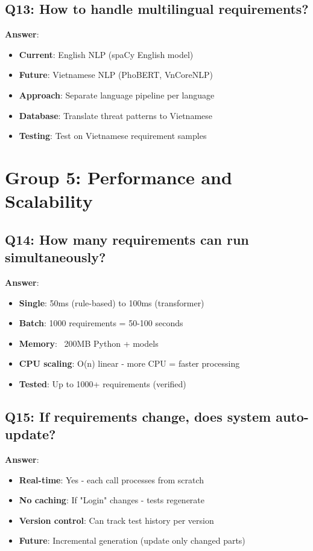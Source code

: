 \documentclass[12pt,a4paper]{report}
\begin{document}
\subsection{Q13: How to handle multilingual requirements?}

\textbf{Answer}:
\begin{itemize}
    \item \textbf{Current}: English NLP (spaCy English model)
    \item \textbf{Future}: Vietnamese NLP (PhoBERT, VnCoreNLP)
    \item \textbf{Approach}: Separate language pipeline per language
    \item \textbf{Database}: Translate threat patterns to Vietnamese
    \item \textbf{Testing}: Test on Vietnamese requirement samples
\end{itemize}

\section{Group 5: Performance and Scalability}

\subsection{Q14: How many requirements can run simultaneously?}

\textbf{Answer}:
\begin{itemize}
    \item \textbf{Single}: 50ms (rule-based) to 100ms (transformer)
    \item \textbf{Batch}: 1000 requirements = 50-100 seconds
    \item \textbf{Memory}: ~200MB Python + models
    \item \textbf{CPU scaling}: O(n) linear - more CPU = faster processing
    \item \textbf{Tested}: Up to 1000+ requirements (verified)
\end{itemize}

\subsection{Q15: If requirements change, does system auto-update?}

\textbf{Answer}:
\begin{itemize}
    \item \textbf{Real-time}: Yes - each call processes from scratch
    \item \textbf{No caching}: If "Login" changes - tests regenerate
    \item \textbf{Version control}: Can track test history per version
    \item \textbf{Future}: Incremental generation (update only changed parts)
\end{itemize}
\end{document}
